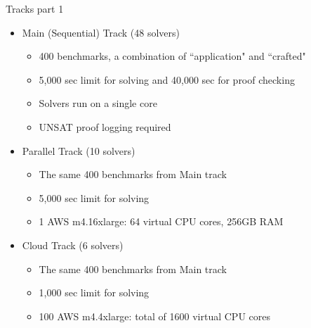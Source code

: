 \documentclass{beamer}
\begin{document}
\begin{frame}{Tracks part 1}
\begin{itemize}
\item Main (Sequential) Track (48 solvers)
\begin{itemize}
\item 400 benchmarks, a combination of ``application" and ``crafted"
\item 5,000 sec limit for solving and 40,000 sec for proof checking
\item Solvers run on a single core
\item UNSAT proof logging required
\end{itemize}
\pause
\medskip
\item Parallel Track (10 solvers)
\begin{itemize}
\item The same 400 benchmarks from Main track
\item 5,000 sec limit for solving
\item 1 AWS m4.16xlarge: 64 virtual CPU cores, 256GB RAM
\end{itemize}
\pause
\medskip
\item Cloud Track (6 solvers)
\begin{itemize}
\item The same 400 benchmarks from Main track
\item 1,000 sec limit for solving
\item 100 AWS m4.4xlarge: total of 1600 virtual CPU cores
\end{itemize}
\end{itemize}
\end{frame}
\end{document}
